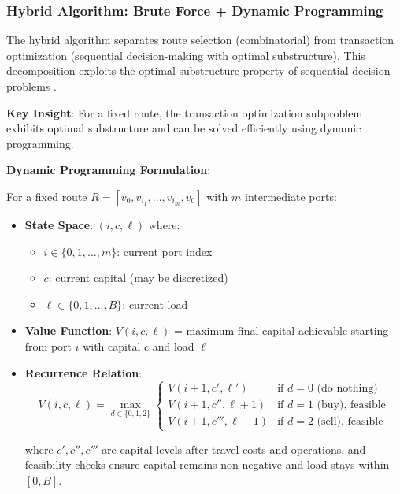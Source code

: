 \documentclass[12pt]{article}
\begin{document}
\subsubsection{Hybrid Algorithm: Brute Force + Dynamic Programming}

The hybrid algorithm separates route selection (combinatorial) from transaction optimization (sequential decision-making with optimal substructure). This decomposition exploits the optimal substructure property of sequential decision problems \cite{bellman1957}.

\textbf{Key Insight}: For a fixed route, the transaction optimization subproblem exhibits optimal substructure and can be solved efficiently using dynamic programming.

\textbf{Dynamic Programming Formulation}:

For a fixed route $R = [v_0, v_{i_1}, ..., v_{i_m}, v_0]$ with $m$ intermediate ports:

\begin{itemize}
    \item \textbf{State Space}: $(i, c, \ell)$ where:
    \begin{itemize}
        \item $i \in \{0, 1, ..., m\}$: current port index
        \item $c$: current capital (may be discretized)
        \item $\ell \in \{0, 1, ..., B\}$: current load
    \end{itemize}
    
    \item \textbf{Value Function}: $V(i, c, \ell)$ = maximum final capital achievable starting from port $i$ with capital $c$ and load $\ell$
    
    \item \textbf{Recurrence Relation}:
    $$V(i, c, \ell) = \max_{d \in \{0,1,2\}} \begin{cases}
        V(i+1, c', \ell') & \text{if } d=0 \text{ (do nothing)} \\
        V(i+1, c'', \ell+1) & \text{if } d=1 \text{ (buy), feasible} \\
        V(i+1, c''', \ell-1) & \text{if } d=2 \text{ (sell), feasible}
    \end{cases}$$
    
    where $c', c'', c'''$ are capital levels after travel costs and operations, and feasibility checks ensure capital remains non-negative and load stays within $[0, B]$.
\end{itemize}
\end{document}
